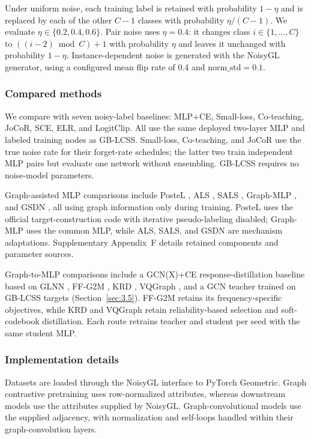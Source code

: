 \documentclass[times,review,10pt]{elsarticle}
\theoremstyle{definition}
\theoremstyle{plain}
\begin{document}
Under uniform noise, each training label is retained with probability \(1-\eta\) and is replaced by each of the other \(C-1\) classes with probability \(\eta/(C-1)\). We evaluate \(\eta\in\{0.2,0.4,0.6\}\). Pair noise uses \(\eta=0.4\): it changes class \(i\in\{1,\ldots,C\}\) to \(((i-2)\bmod C)+1\) with probability \(\eta\) and leaves it unchanged with probability \(1-\eta\). Instance-dependent noise is generated with the NoisyGL generator, using a configured mean flip rate of 0.4 and \(\text{norm\_std}=0.1\).

\subsubsection{Compared methods}\label{sec:4.1.3}

We compare with seven noisy-label baselines: MLP+CE, Small-loss, Co-teaching, JoCoR, SCE, ELR, and LogitClip. All use the same deployed two-layer MLP and labeled training nodes as GB-LCSS. Small-loss, Co-teaching, and JoCoR use the true noise rate for their forget-rate schedules; the latter two train independent MLP pairs but evaluate one network without ensembling. GB-LCSS requires no noise-model parameters.

Graph-assisted MLP comparisons include PosteL \cite{ref54}, ALS \cite{ref55}, SALS \cite{ref56}, Graph-MLP \cite{ref3}, and GSDN \cite{ref40}, all using graph information only during training. PosteL uses the official target-construction code with iterative pseudo-labeling disabled; Graph-MLP uses the common MLP, while ALS, SALS, and GSDN are mechanism adaptations. Supplementary Appendix~F details retained components and parameter sources.

Graph-to-MLP comparisons include a GCN(X)+CE response-distillation baseline based on GLNN \cite{ref4}, FF-G2M \cite{ref45}, KRD \cite{ref46}, VQGraph \cite{ref47}, and a GCN teacher trained on GB-LCSS targets (Section~\ref{sec:3.5}). FF-G2M retains its frequency-specific objectives, while KRD and VQGraph retain reliability-based selection and soft-codebook distillation. Each route retrains teacher and student per seed with the same student MLP.

\subsubsection{Implementation details}\label{sec:4.1.4}

Datasets are loaded through the NoisyGL interface to PyTorch Geometric. Graph contrastive pretraining uses row-normalized attributes, whereas downstream models use the attributes supplied by NoisyGL. Graph-convolutional models use the supplied adjacency, with normalization and self-loops handled within their graph-convolution layers.
\end{document}
